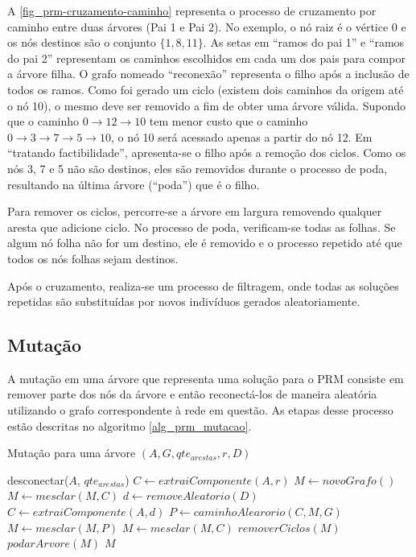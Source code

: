 A \autoref{fig_prm-cruzamento-caminho} representa o processo de cruzamento por caminho entre duas árvores (Pai 1 e Pai 2). No exemplo, o nó raiz é o vértice 0 e os nós destinos são o conjunto $\{1, 8, 11\}$. As setas em ``ramos do pai 1'' e ``ramos do pai 2'' representam os caminhos escolhidos em cada um dos pais para compor a árvore filha. O grafo nomeado ``reconexão'' representa o filho após a inclusão de todos os ramos. Como foi gerado um ciclo (existem dois caminhos da origem até o nó 10), o mesmo deve ser removido a fim de obter uma árvore válida. Supondo que o caminho $0 \rightarrow 12 \rightarrow 10$ tem menor custo que o caminho $0 \rightarrow 3 \rightarrow 7 \rightarrow 5 \rightarrow 10$, o nó 10 será acessado apenas a partir do nó 12. Em ``tratando factibilidade'', apresenta-se o filho após a remoção dos ciclos. Como os nós 3, 7 e 5 não são destinos, eles são removidos durante o processo de poda, resultando na última árvore (``poda'') que é o filho.

Para remover os ciclos, percorre-se a árvore em largura removendo qualquer aresta que adicione ciclo. No processo de poda, verificam-se todas as folhas. Se algum nó folha não for um destino, ele é removido e o processo repetido até que todos os nós folhas sejam destinos.

Após o cruzamento, realiza-se um processo de filtragem, onde todas as soluções repetidas são substituídas por novos indivíduos gerados aleatoriamente.

\subsection{Mutação}

A mutação em uma árvore que representa uma solução para o PRM consiste em remover parte dos nós da árvore e então reconectá-los de maneira aleatória utilizando o grafo correspondente à rede em questão. As etapas desse processo estão descritas no algoritmo \ref{alg_prm_mutacao}.

\begin{algorithm}
	\caption{Mutação para uma árvore $(A, G, qte_{arestas}, r, D)$}
	\label{alg_prm_mutacao}
	\begin{algorithmic}[1]
		\State desconectar($A$, $qte_{arestas}$)
		\State $C \gets extraiComponente(A, r)$
		\State $M \gets novoGrafo()$
		\State $M \gets mesclar(M, C)$
		\State $d \gets removeAleatorio(D)$
		\State $C \gets extraiComponente(A, d)$
		\State $P \gets caminhoAlearorio(C, M, G)$
		\State $M \gets mesclar(M, P)$
		\EndIf
		\State $M \gets mesclar(M, C)$
		\EndWhile
		\State $removerCiclos(M)$
		\State $podarArvore(M)$
		\State \Return $M$
	\end{algorithmic}
\end{algorithm}

